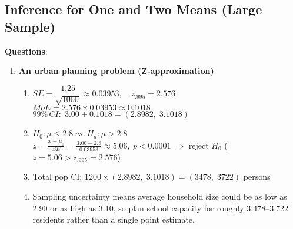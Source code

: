 \documentclass{article}
\begin{document}

\subsection{Inference for One and Two Means (Large Sample)}


\textbf{Questions}:
\begin{enumerate} %

\item \textbf{An urban planning problem (Z‐approximation)}
\begin{enumerate}[label=(\alph*)]
  \item 
    $SE=\dfrac{1.25}{\sqrt{1000}}\approx0.03953,\quad z_{.995}=2.576$\\
    $MoE=2.576\times0.03953\approx0.1018$\\
    $99\%\,CI:\;3.00\pm0.1018=(2.8982,\;3.1018)$
  \item 
    $H_0:\mu\le2.8\ vs.\ H_a:\mu>2.8$\\
    $z=\frac{\bar{x}-\mu_0}{SE}=\frac{3.00-2.8}{0.03953}\approx5.06,\ p\!<0.0001\;\Rightarrow$ reject $H_0$ ($z=5.06 > z_{.995}=2.576$)
  \item 
    Total pop CI: $1200\times(2.8982,\;3.1018)=(3478,\;3722)$ persons
  \item 
    Sampling uncertainty means average household size could be as low as 2.90 or as high as 3.10, so plan school capacity for roughly 3,478–3,722 residents rather than a single point estimate.
\end{enumerate}


\end{enumerate}
\end{document}

